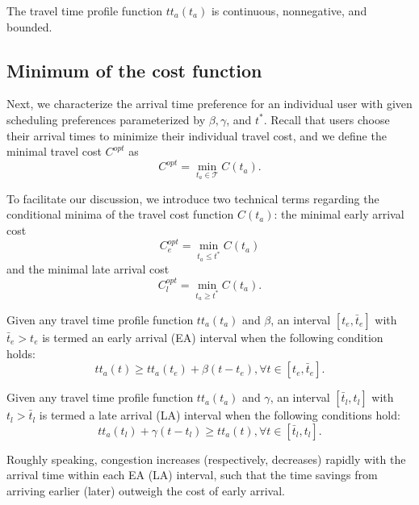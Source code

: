 \begin{assumption}\label{ass:continous}
   The travel time profile function $tt_a(t_a)$ is continuous, nonnegative, and bounded. 
\end{assumption}

\subsection{Minimum of the cost function}
\label{sec:cost_minima}

Next, we characterize the arrival time preference for an individual user with given scheduling preferences parameterized by $\beta, \gamma$, and $t^*$. Recall that users choose their arrival times to minimize their individual travel cost, and we define the minimal travel cost $C^{opt}$ as
    \begin{equation*}
      C^{opt} = \min_{t_a \in \mathcal{T}}C(t_a).
    \end{equation*} 

To facilitate our discussion, we introduce two technical terms regarding the conditional minima of the travel cost function $C(t_a)$: the minimal early arrival cost$$C_e^{opt}  = \min_{t_a \le  t^*}C(t_a)$$ and the minimal late arrival cost  $$C_l^{opt} =  \min_{t_a \ge  t^*}C(t_a).$$ 

\begin{definition}\label{def:CEA}
    Given any travel time profile function $tt_a(t_a)$ and \(\beta\),  an interval $[t_e, \bar t_e]$ with $\bar t_e > t_e$ is termed an early arrival (EA) interval when the following condition holds:
\begin{equation}\label{eq:increase_faster}
    tt_a(t ) \ge tt_a(t_e)  + \beta (t - t_e ), \forall t \in [t_e, \bar t_e].
\end{equation} 
\end{definition}

\begin{definition}
    Given any travel time profile function $tt_a(t_a)$ and \( \gamma\), an interval $[\bar t_l, t_l]$ with $t_l >\bar t_l$ is termed a late arrival (LA) interval when the following conditions hold:
    \begin{equation}\label{eq:decrease_faster}
        tt_a(t_l)  + \gamma  (t - t_l ) \ge  tt_a(t ), \forall  t \in [\bar  t_l, t_l].
\end{equation} 
 
\end{definition}

Roughly speaking, congestion increases (respectively, decreases) rapidly with the arrival time within each EA (LA) interval, such that the time savings from arriving earlier (later) outweigh the cost of early arrival. 

